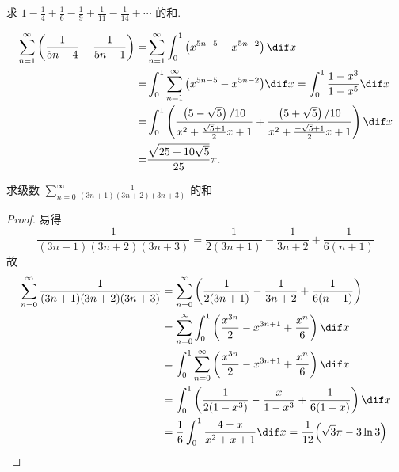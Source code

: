 \documentclass[color=green,titlestyle=hang]{elegantbook}%
\begin{document}
\begin{exercise}
求 $1 - \frac{1}{4} + \frac{1}{6} - \frac{1}{9} + \frac{1}{{11}} - \frac{1}{{14}} + \cdots$ 的和.
\end{exercise}\begin{solution}
\begin{align*} \sum\limits_{n = 1}^\infty  {\left( {\frac{1}{{5n - 4}} - \frac{1}{{5n - 1}}} \right)}  =& \sum\limits_{n = 1}^\infty  {\int_0^1 {\left( {{x^{5n - 5}} - {x^{5n - 2}}} \right)\dif x} }  \\
=& \int_0^1 {\sum\limits_{n = 1}^\infty  {\left( {{x^{5n - 5}} - {x^{5n - 2}}} \right)} \dif x}  = \int_0^1 {\frac{{1 - {x^3}}}{{1 - {x^5}}}\dif x}  \\
=& \int_0^1 {\left( {\frac{{\left( {5 - \sqrt 5 } \right)/10}}{{{x^2} + \frac{{\sqrt 5  + 1}}{2}x + 1}} + \frac{{\left( {5 + \sqrt 5 } \right)/10}}{{{x^2} + \frac{{ - \sqrt 5  + 1}}{2}x + 1}}} \right)\dif x} \\ =& \frac{{\sqrt {25 + 10\sqrt 5 } }}{{25}}\pi . \end{align*}
\end{solution}

\begin{example}
求级数 $\sum_{n=0}^{\infty}\frac{1}{(3n+1)(3n+2)(3n+3)}$ 的和
\end{example}\begin{proof}%
易得\[\frac{1}{(3n+1)(3n+2)(3n+3)}=\frac{1}{2(3n+1)}-\frac{1}{3n+2}+\frac{1}{6(n+1)}\]
故\begin{align*}
\sum_{n=0}^{\infty}\frac{1}{(3n+1)(3n+2)(3n+3)}
&=\sum_{n=0}^{\infty}\left(\frac{1}{2(3n+1)}-\frac{1}{3n+2}+\frac{1}{6(n+1)}\right)\\
&=\sum_{n=0}^{\infty}\int_0^1\left(\frac{x^{3n}}{2}-x^{3n+1}+\frac{x^n}{6}\right)\dif x\\
&=\int_0^1\sum_{n=0}^{\infty}\left(\frac{x^{3n}}{2}-x^{3n+1}+\frac{x^n}{6}\right)\dif x\\
&=\int_0^1\left(\frac{1}{2(1-x^3)}-\frac{x}{1-x^3}+\frac{1}{6(1-x)}\right)\dif x\\
&=\frac{1}{6}\int_0^1\frac{4-x}{x^2+x+1}\dif x=\frac{1}{12}\Big(\sqrt{3}\pi-3\ln3\Big)
\end{align*}
\end{proof}
\end{document}

